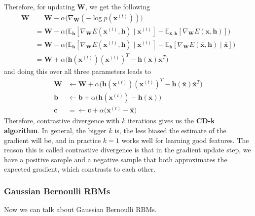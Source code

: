     Therefore, for updating $\mathbf{W}$, we get the following 
    \begin{align*} 
      \mathbf{W} & = \mathbf{W} - \alpha \big( \nabla_{\mathbf{W}}(- \log p(\mathbf{x}^{(t)})) \big) \\
                 & = \mathbf{W} - \alpha \big( \mathbb{E}_{\mathbf{h}} [ \nabla_{\mathbf{W}} E(\mathbf{x}^{(t)}, \mathbf{h}) \mid \mathbf{x}^{(t)} ] - \mathbb{E}_{\mathbf{x}, \mathbf{h}} [\nabla_{\mathbf{W}} E(\mathbf{x}, \mathbf{h}) ]\big) \\
                 & = \mathbf{W} - \alpha \big( \mathbb{E}_{\mathbf{h}} [ \nabla_{\mathbf{W}} E(\mathbf{x}^{(t)}, \mathbf{h}) \mid \mathbf{x}^{(t)} ] - \mathbb{E}_{\mathbf{h}} [\nabla_{\mathbf{W}} E(\bar{\mathbf{x}}, \mathbf{h}) \mid \bar{\mathbf{x}} ]\big) \\
                 & = \mathbf{W} + \alpha \big( \mathbf{h}(\mathbf{x}^{(t)}) (\mathbf{x}^{(t)})^T               - \mathbf{h}(\bar{\mathbf{x}}) \bar{\mathbf{x}}^T \big)
    \end{align*}
    and doing this over all three parameters leads to 
    \begin{align*} 
      \mathbf{W} & \leftarrow \mathbf{W} + \alpha \big( \mathbf{h} (\mathbf{x}^{(t)}) (\mathbf{x}^{(t)})^T - \mathbf{h}(\bar{\mathbf{x}}) \bar{\mathbf{x}}^T \big) \\
      \mathbf{b} & \leftarrow \mathbf{b} + \alpha \big( \mathbf{h}(\mathbf{x}^{(t)}) - \mathbf{h}(\bar{\mathbf{x}}) \big) \\
      \mathbf{c} & = \leftarrow \mathbf{c} + \alpha \big( \mathbf{x}^{(t)} - \hat{\mathbf{x}} \big) 
    \end{align*}
    Therefore, contrastive divergence with $k$ iterations gives us the \textbf{CD-k algorithm}. In general, the bigger $k$ is, the less biased the estimate of the gradient will be, and in practice $k=1$ works well for learning good features. The reason this is called contrastive divergence is that in the gradient update step, we have a positive sample and a negative sample that both approximates the expected gradient, which constrasts to each other. 

  \subsubsection{Gaussian Bernoulli RBMs}

    Now we can talk about Gaussian Bernoulli RBMs. 

